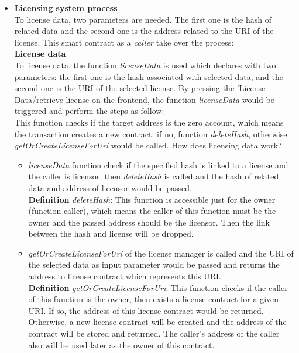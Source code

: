 
\begin{itemize}
	\item \textbf{Licensing system process} \\
	To license data, two parameters are needed. The first one is the hash of related data and the second one is the address related to the URI of the license. This smart contract as a \textit{caller} take over the process: \\
	\textbf{License data} \\
	To license data, the function \textit{licenseData} is used which declares with two parameters: the first one is the hash associated with selected data, and the second one is the URI of the selected license. By pressing the 'License Data/retrieve license on the frontend, the function
	\textit{licenseData} would be triggered and perform the steps as follow: \\
	This function checks if the target address is the zero account, which means the transaction creates a new contract: 
	if no, function \textit{deleteHash}, otherwise \textit{getOrCreateLicenseForUri} would be called. How does licensing data work? \\
	\begin{itemize}
		\item \textit{licenseData} function check if the specified hash is linked to a license and the caller is licensor, then \textit{deleteHash} is called and the hash of related data and address of licensor would be passed. \\
		\hspace{1cm} \textbf{Definition} \textit{deleteHash}: This function is accessible just for the owner (function caller), which means the caller of this function must be the owner and the passed address should be the licensor. Then the link between the hash and license will be dropped.
		\item \textit{getOrCreateLicenseForUri} of the license manager is called and the URI of the selected data as input parameter would be passed and returns the address to license contract which represents this URI.\\
		\hspace{1cm} \textbf{Definition} \textit{getOrCreateLicenseForUri}: This function checks if the caller of this function is the owner, then exists a license contract for a given URI. If so, the address of this license contract would be returned. Otherwise, a new license contract will be created and the address of the contract will be stored and returned. The caller's address of the caller also will be used later as the owner of this contract.

\end{itemize}
\end{itemize}
